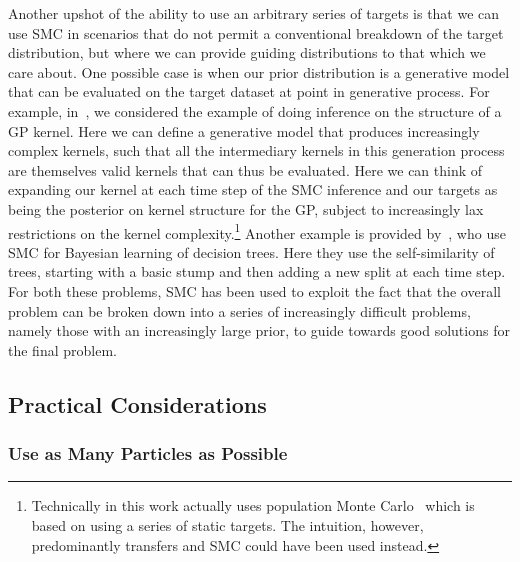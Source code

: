 Another upshot of the ability to use an arbitrary series of targets is that we can use SMC in scenarios that do not
permit a conventional breakdown of the target distribution, but where we 
can provide guiding distributions to that which we care about.  One possible case is when our prior distribution
is a generative model that can be evaluated on the target dataset at point in generative process.
For example, in~\cite{janz2016probstruct}, we considered the example of doing inference
on the structure of a GP kernel.  Here we can define a generative model that produces
increasingly complex kernels, such that all the intermediary kernels in this generation process are themselves
valid kernels that can thus be evaluated.  Here we can think of expanding our kernel at each time step of 
the SMC inference and our targets as being the posterior on kernel structure for the GP, subject to increasingly
lax restrictions on the kernel complexity.\footnote{Technically in this work actually uses population
	Monte Carlo~\cite{cappe2004population} which is based on using a series of static targets.  The
	intuition, however, predominantly transfers and SMC could have been used instead.}  
Another example is provided by~\cite{lakshminarayanan2013top},
who use SMC for Bayesian learning of decision trees.  Here they use the self-similarity of trees, starting
with a basic stump and then adding a new split at each time step.
For both these problems, SMC has been used
to exploit the fact that the overall problem can be broken down into a series of increasingly difficult
problems, namely those with an increasingly large prior, to guide towards good solutions for the final problem.

\subsection{Practical Considerations}
\label{sec:part:smc:prat}

\subsubsection{Use as Many Particles as Possible}
\label{sec:part:smc:prat:part}

